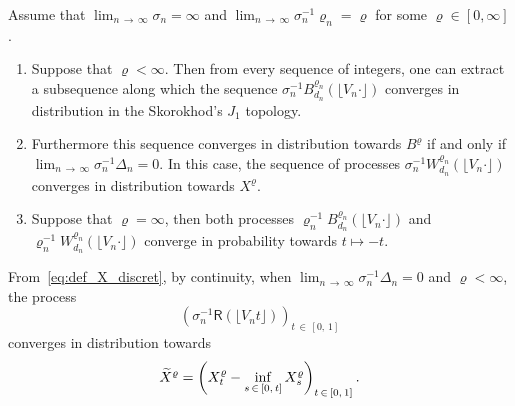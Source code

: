 \documentclass[10pt]{amsart}
\theoremstyle{definition}\newtheorem{defi}[theo]{Definition}\newtheorem{rema}[theo]{Remark}\newtheorem{exam}[theo]{Example}\newtheorem{exem}[theo]{Example}\newtheorem{nota}[theo]{Notation}
\newcommand{\1}{\ensembles{1}}
\newcommand{\tildep}[1]{\widetilde{#1}\vphantom{#1}}
\newcommand{\RR}{\mathsf{R}}
\newcommand{\Wfn}{W_{d_n}^{\varrho_n}}
\newcommand{\Bfn}{B_{d_n}^{\varrho_n}}
\newcommand{\tX}{\tildep{X}^{\varrho}}
\newcommand{\vertices}{V}
\providecommand{\?}{}
\begin{document}
\begin{prop}\label{prop:convergence_Luka}
Assume that $\lim_{n\,\to\,\infty} \sigma_n = \infty$ and $\lim_{n\,\to\,\infty} \sigma_n^{-1} \varrho_n = \varrho$ for some $\varrho \in [0, \infty]$.
\begin{enumerate}
\item Suppose that $\varrho < \infty$. Then from every sequence of integers, one can extract a subsequence along which the sequence $\sigma_n^{-1} \Bfn(\lfloor \vertices_n \cdot \rfloor)$ converges in distribution in the Skorokhod's $J_1$ topology.

\item Furthermore this sequence converges in distribution towards $B^\varrho$ if and only if $\lim_{n\,\to\,\infty} \sigma_n^{-1} \Delta_n = 0$. In this case, the sequence of processes $\sigma_n^{-1} \Wfn(\lfloor \vertices_n \cdot \rfloor)$ converges in distribution towards $X^\varrho$.

\item Suppose that $\varrho = \infty$, then both processes $\varrho_n^{-1} \Bfn(\lfloor \vertices_n \cdot \rfloor)$ and $\varrho_n^{-1} \Wfn(\lfloor \vertices_n \cdot \rfloor)$ converge in probability towards $t \mapsto -t$.
\end{enumerate}
\end{prop}

From~\eqref{eq:def_X_discret}, by continuity, when $\lim_{n\,\to\,\infty} \sigma_n^{-1} \Delta_n = 0$ and $\varrho < \infty$, the process
\[
\left(\sigma_n^{-1} \RR\left(\lfloor \vertices_n t\rfloor\right)\right)_{t\,\in\,[0,\,1]}
\]
converges in distribution towards 
\[
\tX = \left(X^\varrho_t - \inf_{s\,\in\,[0,\,t]} X^\varrho_s\right)_{t\,\in\,[0,\,1]}.
\]
\end{document}
